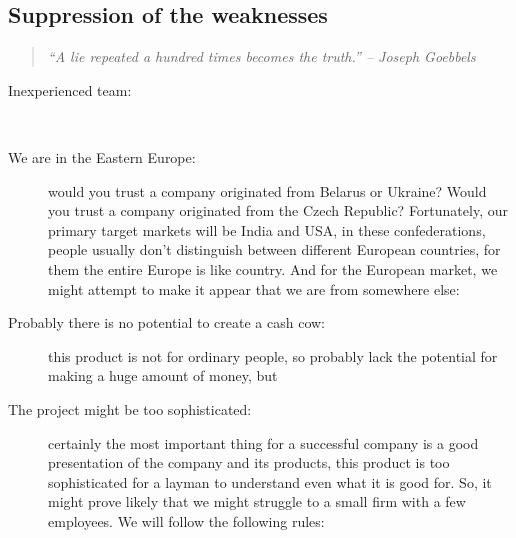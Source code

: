 \documentclass[a4paper,twoside,15pt]{book}
\begin{document}
		\subsection{Suppression of the weaknesses}
			\begin{quote}
				\textit{``A lie repeated a hundred times becomes the truth.'' -- Joseph Goebbels}
			\end{quote}
			 \begin{description}
				\item[Inexperienced team:]~
				\item[We are in the Eastern Europe:]
					would you trust a company originated from Belarus or Ukraine? Would you trust a company originated from the Czech Republic? Fortunately, our primary target markets will be India and USA, in these confederations, people usually don't distinguish between different European countries, for them the entire Europe is like country. And for the European market, we might attempt to make it appear that we are from somewhere else:
				\item[Probably there is no potential to create a cash cow:]
					this product is not for ordinary people, so probably lack the potential for making a huge amount of money, but
				\item[The project might be too sophisticated:]
					certainly the most important thing for a successful company is a good presentation of the company and its products, this product is too sophisticated for a layman to understand even what it is good for. So, it might prove likely that we might struggle to a small firm with a few employees. We will follow the following rules:

\end{description}
\end{document}
